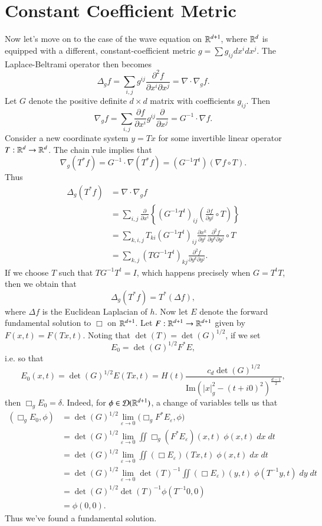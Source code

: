 \section{Constant Coefficient Metric}

Now let's move on to the case of the wave equation on $\operatorname{\mathbb{R}}^{d+1}$, where $\operatorname{\mathbb{R}}^d$ is equipped with a different, constant-coefficient metric $g = \sum g_{ij} dx^i dx^j$. The Laplace-Beltrami operator then becomes
%
\[ \Delta_g f = \sum_{i,j} g^{ij} \frac{\partial^2 f}{\partial x^i \partial x^j} = \nabla \cdot \nabla_g f. \]
%
Let $G$ denote the positive definite $d \times d$ matrix with coefficients $g_{ij}$. Then
%
\[ \nabla_g f = \sum_{i,j} \frac{\partial f}{\partial x^i} g^{ij} \frac{\partial}{\partial x^j} = G^{-1} \cdot \nabla f. \]
%
Consider a new coordinate system $y = Tx$ for some invertible linear operator $T: \operatorname{\mathbb{R}}^d \to \operatorname{\mathbb{R}}^d$. The chain rule implies that 
%
\[ \nabla_g (T^* f) = G^{-1} \cdot \nabla (T^* f) = (G^{-1} T^t) (\nabla f \circ T). \]
%
Thus
%
\begin{align*}
    \Delta_g(T^* f) &= \nabla \cdot \nabla_g f\\
    &= \sum_{i,j} \frac{\partial}{\partial x^i} \left\{ (G^{-1} T^t)_{ij} \left( \frac{\partial f}{\partial y^j} \circ T \right) \right\}\\
    &= \sum_{k,i,j} T_{ki} (G^{-1} T^t)_{ij} \frac{\partial x^k}{\partial y^i} \frac{\partial^2 f}{\partial y^k \partial y^j} \circ T\\
    &= \sum_{k,j} (TG^{-1} T^t)_{kj} \frac{\partial^2 f}{\partial y^k \partial y^j}.
\end{align*}
%
If we choose $T$ such that $TG^{-1}T^t = I$, which happens precisely when $G = T^t T$, then we obtain that
%
\[ \Delta_g (T^* f) = T^*(\Delta f), \]
%
where $\Delta f$ is the Euclidean Laplacian of $h$.
%
%
Now let $E$ denote the forward fundamental solution to $\Box$ on $\operatorname{\mathbb{R}}^{d+1}$. Let $F: \operatorname{\mathbb{R}}^{d+1} \to \operatorname{\mathbb{R}}^{d+1}$ given by $F(x,t) = F(Tx, t)$. Noting that $\det(T) = \det(G)^{1/2}$, if we set
%
\[ E_0 = \det(G)^{1/2} F^* E, \]
%
i.e. so that
%
\[ E_0(x,t) = \det(G)^{1/2} E(Tx,t) = H(t) \frac{c_d \det(G)^{1/2}}{\text{Im}( |x|_g^2 - (t + i0)^2 )^{\frac{d-1}{2}}}, \]
%
then $\Box_g E_0 = \delta$. Indeed, for $\phi \in \operatorname{\mathcal{D}}(\operatorname{\mathbb{R}}^{d+1})$, a change of variables tells us that
%
\begin{align*}
    ( \Box_g E_0, \phi ) &= \det(G)^{1/2} \lim_{\varepsilon \to 0} \Big( \Box_g F^* E_\varepsilon, \phi \Big)\\
    &= \det(G)^{1/2} \lim_{\varepsilon \to 0} \iint \Box_g (F^* E_\varepsilon)(x,t)\; \phi(x,t)\; dx\; dt\\
    &= \det(G)^{1/2} \lim_{\varepsilon \to 0} \iint (\Box E_\varepsilon)(Tx,t)\; \phi(x,t)\; dx\; dt\\
    &= \det(G)^{1/2} \lim_{\varepsilon \to 0} \det(T)^{-1} \iint (\Box E_\varepsilon)(y,t)\; \phi(T^{-1} y, t)\; dy\; dt\\
    &= \det(G)^{1/2} \det(T)^{-1} \phi(T^{-1} 0, 0)\\
    &= \phi(0,0).
\end{align*}
%
Thus we've found a fundamental solution.

